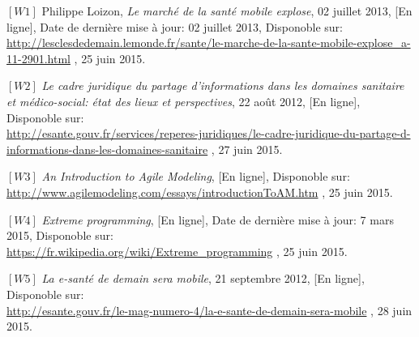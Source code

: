 \footnotesize

\noindent $[W1]$ \hspace{2pt} Philippe Loizon, \textit{Le marché de la santé mobile explose}, 02 juillet 2013, [En ligne], Date de dernière mise à jour: 02 juillet 2013, Disponoble sur: \\
\scriptsize{\underline{http://lesclesdedemain.lemonde.fr/sante/le-marche-de-la-sante-mobile-explose\_a-11-2901.html}} \footnotesize, 25 juin 2015.

\vspace{8pt}
\paragraphmark

\noindent $[W2]$ \hspace{2pt} \textit{Le cadre juridique du partage d’informations dans les domaines sanitaire et médico-social: état des lieux et perspectives}, 22 août 2012, [En ligne], Disponoble sur: \\
\scriptsize{\underline{http://esante.gouv.fr/services/reperes-juridiques/le-cadre-juridique-du-partage-d-informations-dans-les-domaines-sanitaire}} \footnotesize, 27 juin 2015.

\vspace{8pt}
\paragraphmark

\noindent $[W3]$ \hspace{2pt} \textit{An Introduction to Agile Modeling}, [En ligne], Disponoble sur: \\
\scriptsize{\underline{http://www.agilemodeling.com/essays/introductionToAM.htm}} \footnotesize, 25 juin 2015.

\vspace{8pt}
\paragraphmark

\noindent $[W4]$ \hspace{2pt} \textit{Extreme programming}, [En ligne], Date de dernière mise à jour: 7 mars 2015, Disponoble sur: \\
\scriptsize{\underline{https://fr.wikipedia.org/wiki/Extreme\_programming}} \footnotesize, 25 juin 2015.

\vspace{8pt}
\paragraphmark

\noindent $[W5]$ \hspace{2pt} \textit{La e-santé de demain sera mobile},  21 septembre 2012, [En ligne], Disponoble sur: \\
\scriptsize{\underline{http://esante.gouv.fr/le-mag-numero-4/la-e-sante-de-demain-sera-mobile}} \footnotesize, 28 juin 2015.

\vspace{8pt}
\paragraphmark


